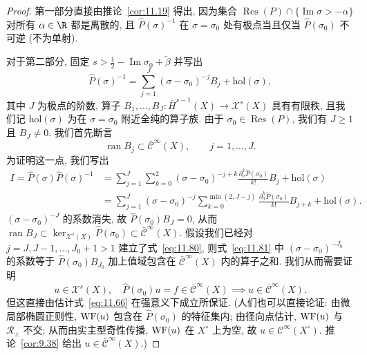 \begin{proof}
第一部分直接由推论~\ref{cor:11.19} 得出, 因为集合 $\operatorname{Res}(P) \cap \{\operatorname{Im}\sigma > -\alpha\}$ 对所有 $\alpha \in \R$ 都是离散的, 且 $\widehat{P}(\sigma)^{-1}$ 在 $\sigma = \sigma_0$ 处有极点当且仅当 $\widehat{P}(\sigma_0)$ 不可逆 (不为单射).

对于第二部分, 固定 $s > \frac{1}{2} - \operatorname{Im}\sigma_0 + \tilde\beta$ 并写出
\begin{equation}\label{eq:11.79}
    \widehat{P}(\sigma)^{-1} = \sum_{j=1}^J (\sigma - \sigma_0)^{-j} B_j + \mathrm{hol}(\sigma),
\end{equation}
其中 $J$ 为极点的阶数, 算子 $B_1, \ldots, B_J \colon \bar H^{s-1}(X) \to \mathcal{X}^s(X)$ 具有有限秩, 且我们记 $\mathrm{hol}(\sigma)$ 为在 $\sigma = \sigma_0$ 附近全纯的算子族. 由于 $\sigma_0 \in \operatorname{Res}(P)$, 我们有 $J \ge 1$ 且 $B_J \neq 0$. 我们首先断言
\begin{equation}\label{eq:11.80}
    \operatorname{ran} B_j \subset \bar{\mathcal{C}}^\infty(X), \qquad j = 1, \ldots, J.
\end{equation}
为证明这一点, 我们写出
\begin{equation}\label{eq:11.81}
\begin{aligned}
    I = \widehat{P}(\sigma) \widehat{P}(\sigma)^{-1} &= \sum_{j=1}^J \sum_{k=0}^2 (\sigma - \sigma_0)^{-j+k} \frac{\partial_\sigma^k \widehat{P}(\sigma_0)}{k!} B_j + \mathrm{hol}(\sigma) \\
    &= \sum_{j=1}^J (\sigma - \sigma_0)^{-j} \sum_{k=0}^{\min(2, J-j)} \frac{\partial_\sigma^k \widehat{P}(\sigma_0)}{k!} B_{j+k} + \mathrm{hol}(\sigma).
\end{aligned}
\end{equation}
$(\sigma - \sigma_0)^{-J}$ 的系数消失, 故 $\widehat{P}(\sigma_0) B_J = 0$, 从而 $\operatorname{ran} B_J \subset \ker_{\mathcal{X}^s(X)} \widehat{P}(\sigma_0) \subset \bar{\mathcal{C}}^\infty(X)$. 假设我们已经对 $j = J, J-1, \ldots, J_0+1 > 1$ 建立了式~\eqref{eq:11.80}, 则式~\eqref{eq:11.81} 中 $(\sigma - \sigma_0)^{-J_0}$ 的系数等于 $\widehat{P}(\sigma_0) B_{J_0}$ 加上值域包含在 $\bar{\mathcal{C}}^\infty(X)$ 内的算子之和. 我们从而需要证明
\begin{equation}\label{eq:11.82}
    u \in \mathcal{X}^s(X), \quad \widehat{P}(\sigma_0) u = f \in \bar{\mathcal{C}}^\infty(X) \implies u \in \bar{\mathcal{C}}^\infty(X).
\end{equation}
但这直接由估计式~\eqref{eq:11.66} 在强意义下成立所保证. (人们也可以直接论证: 由微局部椭圆正则性, $\operatorname{WF}(u)$ 包含在 $\widehat{P}(\sigma_0)$ 的特征集内; 由径向点估计, $\operatorname{WF}(u)$ 与 $\mathcal{R}_\pm$ 不交; 从而由实主型奇性传播, $\operatorname{WF}(u)$ 在 $X^\circ$ 上为空, 故 $u \in \mathcal{C}^\infty(X^\circ)$. 推论~\ref{cor:9.38} 给出 $u \in \bar{\mathcal{C}}^\infty(X)$.)


\end{proof}
